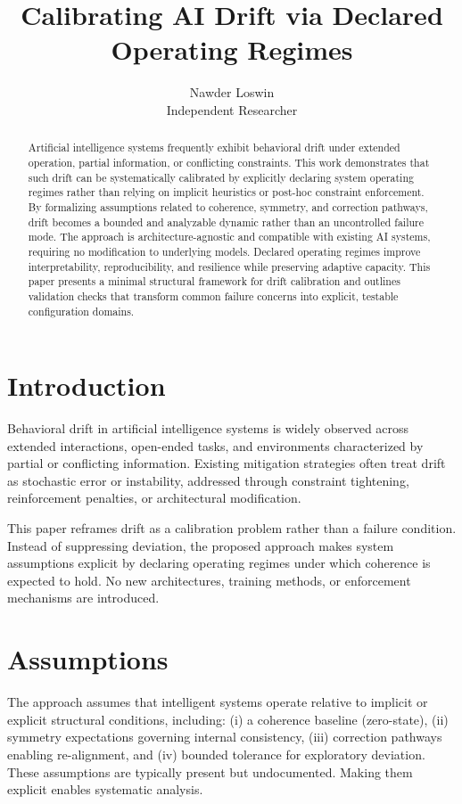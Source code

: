 \documentclass[10pt]{article}
\title{Calibrating AI Drift via Declared Operating Regimes}
\author{Nawder Loswin\\Independent Researcher}
\date{}
\begin{document}
\maketitle

\begin{abstract}
Artificial intelligence systems frequently exhibit behavioral drift under extended operation, partial information, or conflicting constraints. This work demonstrates that such drift can be systematically calibrated by explicitly declaring system operating regimes rather than relying on implicit heuristics or post-hoc constraint enforcement. By formalizing assumptions related to coherence, symmetry, and correction pathways, drift becomes a bounded and analyzable dynamic rather than an uncontrolled failure mode. The approach is architecture-agnostic and compatible with existing AI systems, requiring no modification to underlying models. Declared operating regimes improve interpretability, reproducibility, and resilience while preserving adaptive capacity. This paper presents a minimal structural framework for drift calibration and outlines validation checks that transform common failure concerns into explicit, testable configuration domains.
\end{abstract}

\section{Introduction}
Behavioral drift in artificial intelligence systems is widely observed across extended interactions, open-ended tasks, and environments characterized by partial or conflicting information. Existing mitigation strategies often treat drift as stochastic error or instability, addressed through constraint tightening, reinforcement penalties, or architectural modification.

This paper reframes drift as a calibration problem rather than a failure condition. Instead of suppressing deviation, the proposed approach makes system assumptions explicit by declaring operating regimes under which coherence is expected to hold. No new architectures, training methods, or enforcement mechanisms are introduced.

\section{Assumptions}
The approach assumes that intelligent systems operate relative to implicit or explicit structural conditions, including: (i) a coherence baseline (zero-state), (ii) symmetry expectations governing internal consistency, (iii) correction pathways enabling re-alignment, and (iv) bounded tolerance for exploratory deviation. These assumptions are typically present but undocumented. Making them explicit enables systematic analysis.
\end{document}
